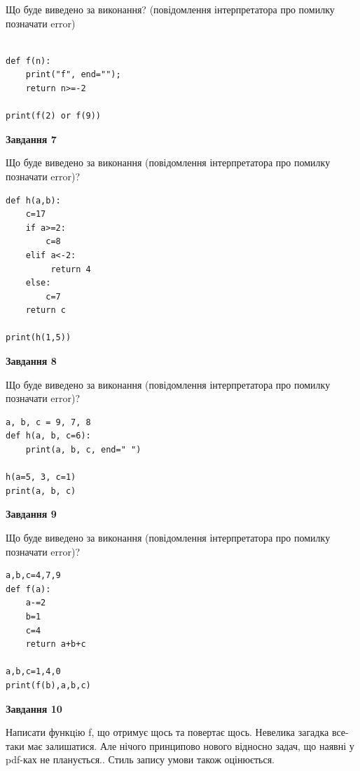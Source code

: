 \documentclass[12pt, ukrainian]{article}
\begin{document}
{\begin {large}
Що буде виведено за виконання? (повідомлення інтерпретатора про помилку позначати error)\par
\begin{verbatim}

def f(n):
    print("f", end="");
    return n>=-2

print(f(2) or f(9))
\end{verbatim}

{\begin {center}\textbf{Завдання 7}\end {center}}

Що буде виведено за виконання (повідомлення інтерпретатора про помилку позначати error)?\par
\begin{verbatim}
def h(a,b):
    c=17
    if a>=2:
        c=8
    elif a<-2:
         return 4
    else: 
        c=7
    return c

print(h(1,5))
\end{verbatim}

{\begin {center}\textbf{Завдання 8}\end {center}}

Що буде виведено за виконання (повідомлення інтерпретатора про помилку позначати error)?\par
\begin{verbatim}
a, b, c = 9, 7, 8
def h(a, b, c=6):
    print(a, b, c, end=" ")

h(a=5, 3, c=1)
print(a, b, c)
\end{verbatim}

{\begin {center}\textbf{Завдання 9}\end {center}}

Що буде виведено за виконання (повідомлення інтерпретатора про помилку позначати error)?\par
\begin{verbatim}
a,b,c=4,7,9
def f(a):
    a-=2
    b=1
    c=4
    return a+b+c

a,b,c=1,4,0
print(f(b),a,b,c)
\end{verbatim}

{\begin {center}\textbf{Завдання 10}\end {center}}


Написати функцiю f, що отримує щось та повертає щось. Невелика загадка все-таки має залишатися. Але нічого принципово нового відносно задач, що наявні у pdf-ках не планується.. Стиль запису умови також оцінюється.\par
\end {large}}
\newpage
\end{document}
